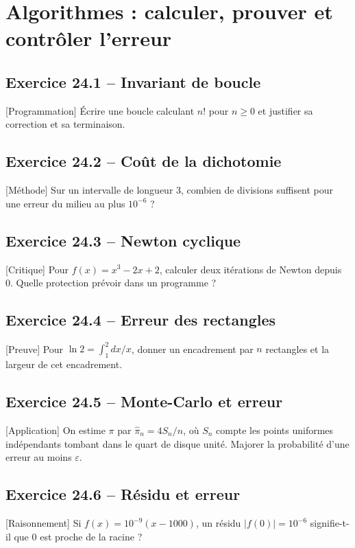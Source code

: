 \chapter{Algorithmes : calculer, prouver et contrôler l’erreur}
\section*{Exercice 24.1 -- Invariant de boucle}
[Programmation] Écrire une boucle calculant $n!$ pour $n\ge0$ et justifier sa correction et sa terminaison.

\section*{Exercice 24.2 -- Coût de la dichotomie}
[Méthode] Sur un intervalle de longueur 3, combien de divisions suffisent pour une erreur du milieu au plus $10^{-6}$ ?

\section*{Exercice 24.3 -- Newton cyclique}
[Critique] Pour $f(x)=x^3-2x+2$, calculer deux itérations de Newton depuis 0. Quelle protection prévoir dans un programme ?

\section*{Exercice 24.4 -- Erreur des rectangles}
[Preuve] Pour $\ln2=\int_1^2dx/x$, donner un encadrement par $n$ rectangles et la largeur de cet encadrement.

\section*{Exercice 24.5 -- Monte-Carlo et erreur}
[Application] On estime $\pi$ par $\widehat\pi_n=4S_n/n$, où $S_n$ compte les points uniformes indépendants tombant dans le quart de disque unité. Majorer la probabilité d'une erreur au moins $\varepsilon$.

\section*{Exercice 24.6 -- Résidu et erreur}
[Raisonnement] Si $f(x)=10^{-9}(x-1000)$, un résidu $|f(0)|=10^{-6}$ signifie-t-il que 0 est proche de la racine ?
